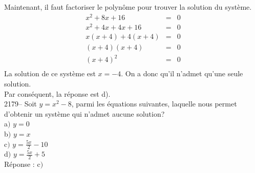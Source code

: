 \documentclass[letterpaper, 12pt]{article}
\begin{document}
Maintenant, il faut factoriser le polyn\^ome pour trouver la solution du syst\`eme.
\begin{eqnarray*}
 x^{2}+8x+16 &=& 0\\
 x^{2}+4x+4x+16 &=& 0\\
 x(x+4)+4(x+4) &=& 0\\
 (x+4)(x+4) &=& 0\\
 (x+4)^{2}&=& 0\\
\end{eqnarray*}
La solution de ce syst\`eme est $x=-4$. On a donc qu'il n'admet qu'une seule solution.\\
Par cons\'equent, la r\'eponse est d).\\

2179-- Soit $y=x^{2}-8$, parmi les \'equations suivantes, laquelle nous permet d'obtenir un syst\`eme qui n'admet aucune solution? \\

a$)$ $y=0$\\
b$)$ $y=x$\\
c$)$ $y=\frac{5x}{2}-10$\\[2mm]
d$)$ $y=\frac{5x}{2}+5$\\

R\'eponse : c$)$\\
\end{document}
